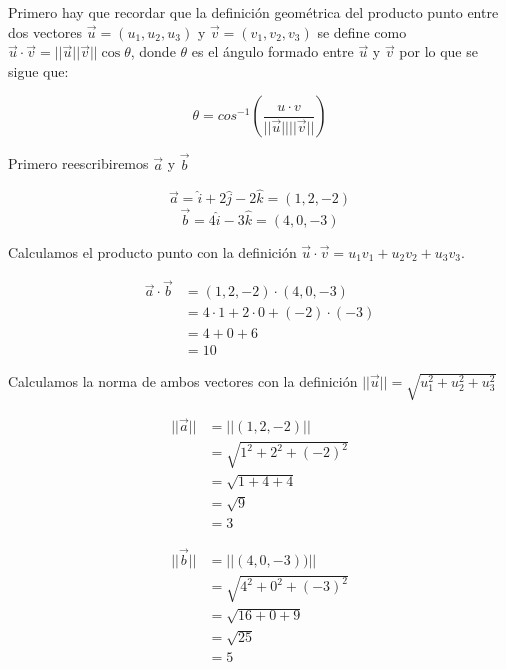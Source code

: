 \documentclass[12pt]{article}
\begin{document}
Primero hay que recordar que la definición geométrica del producto punto entre dos vectores $\vec{u} = (u_1, u_2, u_3)$ y  $\vec{v} = (v_1, v_2, v_3)$ se define como  $\vec{u} \cdot \vec{v} = ||\vec{u} || \vec{v}|| \cos{\theta}$, donde $\theta$ es el ángulo formado entre $\vec{u}$ y $\vec{v}$  por lo que se sigue que:

\[
\theta = cos^{-1 }\left(\frac{u \cdot v}{||\vec{u}|| ||\vec{v}||}\right)
\]

Primero reescribiremos $\vec{a}$ y $\vec{b}$

\[
\vec{a} =  \hat{i} + 2\hat{j}-2\hat{k} = (1, 2, -2)
\]
\[
\vec{b} =4\hat{i} -3\hat{k}= (4, 0, -3)
\]

Calculamos el producto punto con la definición  $\vec{u} \cdot \vec{v} = u_1v_1 + u_2v_2+u_3v_3$.

\begin{equation*}
  \begin{split}
    \vec{a} \cdot \vec{b}  &= (1, 2, -2) \cdot  (4, 0, -3)  \\
    &= 4 \cdot 1 + 2 \cdot 0 + (-2) \cdot (-3) \\
    &= 4 + 0 +6 \\
    &= 10 
  \end{split}
\end{equation*}

Calculamos la norma de ambos vectores con la definición $ ||\vec{u}|| = \sqrt{u_1^2 + u_2^2 + u_3^2} $

\begin{equation*}
  \begin{split}
    ||\vec{a}||  &= ||(1, 2, -2)||  \\
    &= \sqrt{1^2 + 2^2 + (-2)^2} \\
    &= \sqrt{1 + 4 + 4} \\
    &= \sqrt{9} \\
    &=3
  \end{split}
\end{equation*}

\begin{equation*}
  \begin{split}
    ||\vec{b}||  &= ||(4, 0, -3))||  \\
    &= \sqrt{4^2 + 0^2 + (-3)^2} \\
    &= \sqrt{16 + 0 + 9} \\
    &= \sqrt{25} \\
    &= 5
  \end{split}
\end{equation*}
\end{document}
